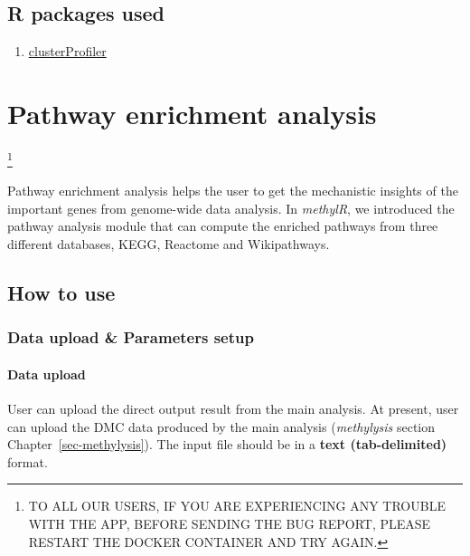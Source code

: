 \documentclass[
  a4paper,
  oneside,
  open=any]{scrreport}
\providecommand{\tightlist}{%
  \setlength{\itemsep}{0pt}\setlength{\parskip}{0pt}}\usepackage{longtable,booktabs,array}
\begin{document}
\hypertarget{r-packages-used-4}{%
\section{R packages used}\label{r-packages-used-4}}

\begin{enumerate}
\def\labelenumi{\arabic{enumi}.}
\tightlist
\item
  \href{https://bioconductor.org/packages/release/bioc/vignettes/clusterProfiler/inst/doc/clusterProfiler.html}{clusterProfiler}
\end{enumerate}

\hypertarget{sec-pathway}{%
\chapter{Pathway enrichment analysis}\label{sec-pathway}}

\footnote{TO ALL OUR USERS, IF YOU ARE EXPERIENCING ANY TROUBLE WITH THE
  APP, BEFORE SENDING THE BUG REPORT, PLEASE RESTART THE DOCKER
  CONTAINER AND TRY AGAIN.}

Pathway enrichment analysis helps the user to get the mechanistic
insights of the important genes from genome-wide data analysis. In
\emph{methylR}, we introduced the pathway analysis module that can
compute the enriched pathways from three different databases, KEGG,
Reactome and Wikipathways.

\hypertarget{how-to-use-8}{%
\section{How to use}\label{how-to-use-8}}

\hypertarget{data-upload-parameters-setup-5}{%
\subsection{Data upload \& Parameters
setup}\label{data-upload-parameters-setup-5}}

\hypertarget{data-upload-5}{%
\subsubsection{Data upload}\label{data-upload-5}}

User can upload the direct output result from the main analysis. At
present, user can upload the DMC data produced by the main analysis
(\emph{methylysis} section Chapter~\ref{sec-methylysis}). The input file
should be in a \textbf{text (tab-delimited)} format.
\end{document}

